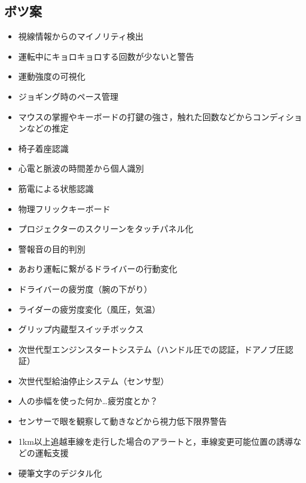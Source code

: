 \documentclass[a4j,10pt]{jarticle}
\begin{document}
\begin{multicols}{2}
  \section{ボツ案}
  \begin{itemize}
    \item 視線情報からのマイノリティ検出
    \item 運転中にキョロキョロする回数が少ないと警告
    \item 運動強度の可視化
    \item ジョギング時のペース管理
    \item マウスの掌握やキーボードの打鍵の強さ，触れた回数などからコンディションなどの推定
    \item 椅子着座認識
    \item 心電と脈波の時間差から個人識別
    \item 筋電による状態認識
    \item 物理フリックキーボード
    \item プロジェクターのスクリーンをタッチパネル化
    \item 警報音の目的判別
    \item あおり運転に繋がるドライバーの行動変化
    \item ドライバーの疲労度（腕の下がり）
    \item ライダーの疲労度変化（風圧，気温）
    \item グリップ内蔵型スイッチボックス
    \item 次世代型エンジンスタートシステム（ハンドル圧での認証，ドアノブ圧認証）
    \item 次世代型給油停止システム（センサ型）
    \item 人の歩幅を使った何か…疲労度とか？
    \item センサーで眼を観察して動きなどから視力低下限界警告
    \item 1km以上追越車線を走行した場合のアラートと，車線変更可能位置の誘導などの運転支援
    \item 硬筆文字のデジタル化
  \end{itemize}
\end{multicols}
\end{document}
